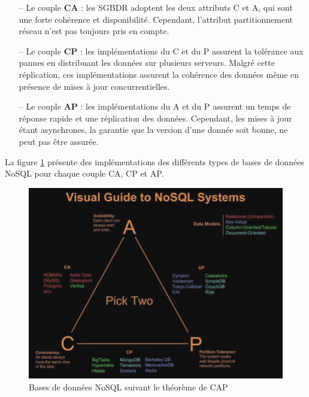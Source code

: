 		\begin{itemize}
			\item [--] Le couple \textbf{CA} : les SGBDR adoptent les deux attributs C et A, qui sont une forte cohérence et disponibilité. Cependant, l'attribut partitionnement réseau n'est pas toujours pris en compte.
			\item [--] Le couple \textbf{CP} : les implémentations du C et du P assurent la tolérance aux pannes en distribuant les données sur plusieurs serveurs. Malgré cette réplication, ces implémentations assurent la cohérence des données même en présence de mises à jour concurrentielles.
			\item [--] Le couple \textbf{AP} : les implémentations du A et du  P assurent un temps de réponse rapide et une réplication des données. Cependant, les mises à jour étant asynchrones, la garantie que la version d'une donnée soit bonne, ne peut pas être assurée.
			
		\end{itemize}
		
		La figure \ref{fig:cap} présente des implémentations des différents types de bases de données NoSQL pour chaque couple CA, CP et AP.
		
		\begin{figure}[H]
			\centering
			\captionsetup{justification=centering}
			\includegraphics[width=1\linewidth]{illustrations/cap}
			\caption{Bases de données NoSQL suivant le théorème de CAP }
			\label{fig:cap}
		\end{figure}
		
